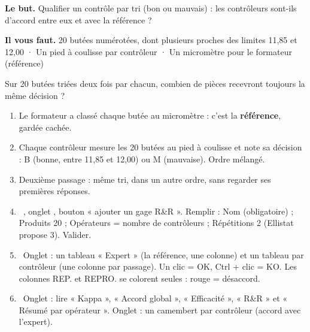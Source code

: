 \documentclass[10pt,a4paper]{article}
\begin{document}
\thispagestyle{fancy}
\begin{tcolorbox}[boite]\textbf{Le but.} Qualifier un contrôle par tri (bon ou mauvais) : les contrôleurs sont-ils d'accord entre eux et avec la référence ?\par\textbf{Il vous faut.} 20 butées numérotées, dont plusieurs proches des limites 11,85 et 12,00 · Un pied à coulisse par contrôleur · Un micromètre pour le formateur (référence)\end{tcolorbox}
\begin{tcolorbox}[pred]Sur 20 butées triées deux fois par chacun, combien de pièces recevront toujours la même décision ?\reponse\end{tcolorbox}
\begin{enumerate}[label=\textcolor{cyan}{\textbf{\arabic*.}},leftmargin=15pt,itemsep=1.5pt]
\item Le formateur a classé chaque butée au micromètre : c'est la \textbf{référence}, gardée cachée.
\item Chaque contrôleur mesure les 20 butées au pied à coulisse et note sa décision : B (bonne, entre 11,85 et 12,00) ou M (mauvaise). Ordre mélangé.
\item Deuxième passage : même tri, dans un autre ordre, sans regarder ses premières réponses.
\item \tagE\ , onglet , bouton « ajouter un gage R\&R ». Remplir : Nom (obligatoire) ; Produits 20 ; Opérateurs = nombre de contrôleurs ; Répétitions 2 (Ellistat propose 3). Valider.
\item \tagE\ Onglet  : un tableau « Expert » (la référence, une colonne) et un tableau par contrôleur (une colonne par passage). Un clic = OK, Ctrl + clic = KO. Les colonnes REP. et REPRO. se colorent seules : rouge = désaccord.
\item \tagE\ Onglet  : lire « Kappa », « Accord global », « Efficacité », « R\&R » et « Résumé par opérateur ». Onglet  : un camembert par contrôleur (accord avec l'expert).
\end{enumerate}
\end{document}
